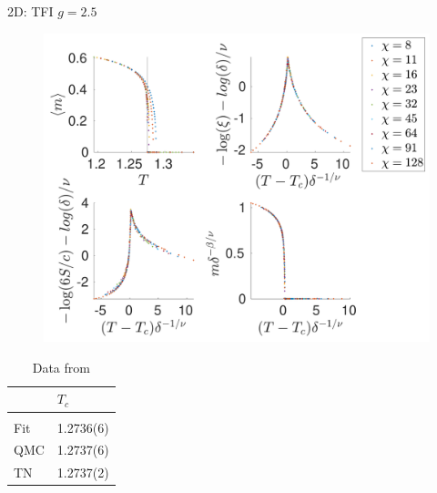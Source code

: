 \begin{frame}{2D: TFI $g=2.5$}
    \begin{minipage}{.75\textwidth}
        \begin{figure}
            \center
            \includegraphics[height=\textheight]{../Figuren/phasediag/g25/zoomed_small.pdf}
        \end{figure}
    \end{minipage}
    \begin{minipage}{.24\textwidth}
        \begin{table}[]
            \caption{Data from  \cite{Czarnik2019} }
            \begin{tabular}{l|l }
                    & $T_c$     \\
                \hline          \\
                Fit & 1.2736(6) \\
                QMC & 1.2737(6) \\
                TN  & 1.2737(2) \\
            \end{tabular}
        \end{table}
    \end{minipage}
\end{frame}
